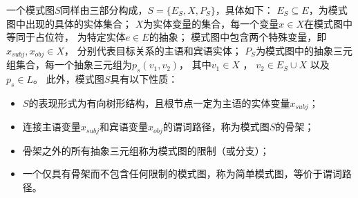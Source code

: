 \begin{definition}


一个模式图$S$同样由三部分构成，$S=\{E_S, X, P_S\}$，具体如下：
$E_S \subseteq E$，为模式图中出现的具体的实体集合；
$X$为实体变量的集合，每一个变量$x \in X$在模式图中等同于占位符，
为特定实体$e \in E$的抽象；
模式图中包含两个特殊变量，即$x_{subj}, x_{obj} \in X$，
分别代表目标关系的主语和宾语实体；
$P_S$为模式图中的抽象三元组集合，每一个抽象三元组为$p_s(v_1, v_2)$，
其中$v_1 \in X$ ， $v_2 \in E_S \cup X$ 以及 $p_s \in L$。
此外，模式图$S$具有以下性质：
\begin{itemize}
  \item $S$的表现形式为有向树形结构，且根节点一定为主语的实体变量$x_{subj}$；
  \item 连接主语变量$x_{subj}$和宾语变量$x_{obj}$的谓词路径，称为模式图$S$的骨架；
  \item 骨架之外的所有抽象三元组称为模式图的限制（或分支）；
  \item 一个仅具有骨架而不包含任何限制的模式图，称为简单模式图，等价于谓词路径。
\end{itemize}

\end{definition}

